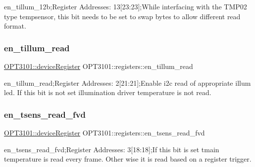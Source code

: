en\+\_\+tillum\+\_\+12b;Register Addresses\+: 13\mbox{[}23\+:23\mbox{]};While interfacing with the T\+M\+P02 type tempsensor, this bit needs to be set to swap bytes to allow different read format. 

\mbox{\label{class_o_p_t3101_1_1registers_ad766b216bd75f0e6099f28f6d8ace68f}} 
\subsubsection{\texorpdfstring{en\+\_\+tillum\+\_\+read}{en\_tillum\_read}}
{\footnotesize\ttfamily \mbox{\hyperlink{class_o_p_t3101_1_1device_register}{O\+P\+T3101\+::device\+Register}} O\+P\+T3101\+::registers\+::en\+\_\+tillum\+\_\+read}



en\+\_\+tillum\+\_\+read;Register Addresses\+: 2\mbox{[}21\+:21\mbox{]};Enable i2c read of appropriate illum led. If this bit is not set illumination driver temperature is not read. 

\mbox{\label{class_o_p_t3101_1_1registers_a791fa84b502f2801766fd8fd6429c4db}} 
\subsubsection{\texorpdfstring{en\+\_\+tsens\+\_\+read\+\_\+fvd}{en\_tsens\_read\_fvd}}
{\footnotesize\ttfamily \mbox{\hyperlink{class_o_p_t3101_1_1device_register}{O\+P\+T3101\+::device\+Register}} O\+P\+T3101\+::registers\+::en\+\_\+tsens\+\_\+read\+\_\+fvd}



en\+\_\+tsens\+\_\+read\+\_\+fvd;Register Addresses\+: 3\mbox{[}18\+:18\mbox{]};If this bit is set tmain temperature is read every frame. Other wise it is read based on a register trigger. 

\mbox{\label{class_o_p_t3101_1_1registers_a72ee56b2c4fc0d6b04e2edfbf036f8ec}} 
